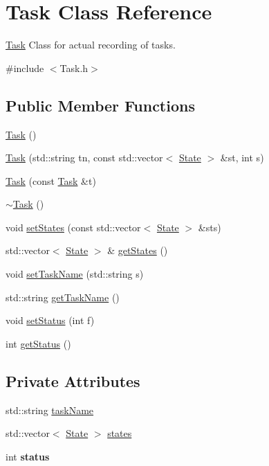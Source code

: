 \hypertarget{classTask}{\section{Task Class Reference}
\label{classTask}
}


\hyperlink{classTask}{Task} Class for actual recording of tasks.  




{\ttfamily \#include $<$Task.\-h$>$}

\subsection*{Public Member Functions}
\begin{DoxyCompactItemize}
\item 
\hyperlink{classTask_a0ca53354bdc006762a0fda68c64f7608}{Task} ()
\item 
\hyperlink{classTask_a544350cb2f0b5688ea5d5079af102d30}{Task} (std\-::string tn, const std\-::vector$<$ \hyperlink{classState}{State} $>$ \&st, int s)
\item 
\hyperlink{classTask_a0aec5018915f11c96398b75f969a3220}{Task} (const \hyperlink{classTask}{Task} \&t)
\item 
\hyperlink{classTask_a3ecf499ea35fb4a96853969a1e1cbbce}{$\sim$\-Task} ()
\item 
void \hyperlink{classTask_ac83639cc4dbbf9a7d9eecfddaab378fd}{set\-States} (const std\-::vector$<$ \hyperlink{classState}{State} $>$ \&sts)
\item 
std\-::vector$<$ \hyperlink{classState}{State} $>$ \& \hyperlink{classTask_a46aa6bb0e5d9d04ba709337b9533274a}{get\-States} ()
\item 
void \hyperlink{classTask_a5e77fab19813030a93a210d506f31301}{set\-Task\-Name} (std\-::string s)
\item 
std\-::string \hyperlink{classTask_abb5dae8b5244e54c7d5015b2e788d803}{get\-Task\-Name} ()
\item 
void \hyperlink{classTask_a59b2ae9a420e2055b3f9e03e643f8bf1}{set\-Status} (int f)
\item 
int \hyperlink{classTask_a7b3e05f3ebf0b3d5c4ae65787d7df64b}{get\-Status} ()
\end{DoxyCompactItemize}
\subsection*{Private Attributes}
\begin{DoxyCompactItemize}
\item 
std\-::string \hyperlink{classTask_a36551b2c460ad511f54cbf203e309917}{task\-Name}
\item 
std\-::vector$<$ \hyperlink{classState}{State} $>$ \hyperlink{classTask_a88351cfb81ef77759a8bc117083733fb}{states}
\item 
\hypertarget{classTask_af3c9b00f6ffaef332b5cff52592e88fd}{int {\bfseries status}}\label{classTask_af3c9b00f6ffaef332b5cff52592e88fd}

\end{DoxyCompactItemize}


